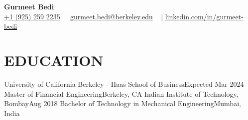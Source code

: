 

\begin{center}
    {\Huge  \textbf{Gurmeet Bedi}} \\ \vspace{1pt}
    \small  \href{tel:19252592235}{+1 (925) 259 2235}  ~$\mid$ \href{mailto:gurmeet.bedi@berkeley.edu}{ gurmeet.bedi@berkeley.edu} ~ $\mid$ \href{https://www.linkedin.com/in/gurmeet-bedi/}{ linkedin.com/in/gurmeet-bedi} 
    \\
    \vspace{1pt}
    \vspace{-8pt}
\end{center}


\section{EDUCATION}
  \resumeSubHeadingListStart
  \resumeSubheading
      {University of California Berkeley - Haas School of Business}{Expected Mar 2024}
      {Master of Financial Engineering}{Berkeley, CA}{}
      \resumeItemListStart
      \resumeItemListEnd
    \resumeSubheading
      {Indian Institute of Technology, Bombay}{Aug 2018}
      {Bachelor of Technology in Mechanical Engineering}{Mumbai, India}{}
  \resumeSubHeadingListEnd

